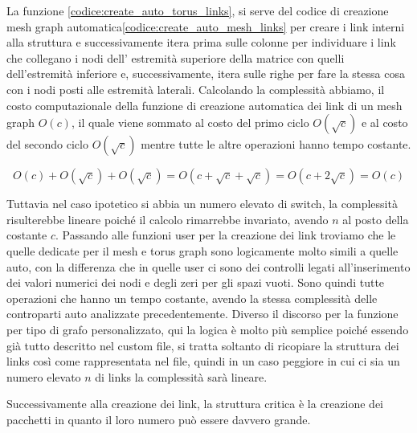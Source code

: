 \documentclass[binding=0.6cm]{sapthesis}
\begin{document}
La funzione \ref{codice:create_auto_torus_links}, si serve del codice di creazione mesh graph automatica\ref{codice:create_auto_mesh_links} per 
creare i link interni alla struttura e successivamente itera prima sulle colonne per individuare i link che collegano i nodi dell' estremità superiore della matrice con quelli dell'estremità inferiore e,
successivamente, itera sulle righe per fare la stessa cosa con i nodi posti alle estremità laterali.
Calcolando la complessità abbiamo, il costo computazionale della funzione di creazione automatica dei link di un mesh graph \(O(c)\), il quale
viene sommato al costo del primo ciclo \(O(\sqrt{c})\) e al costo del secondo ciclo \(O(\sqrt{c})\) mentre tutte le altre operazioni hanno tempo costante.

\[
    O(c) + O(\sqrt{c}) + O(\sqrt{c}) = O(c + \sqrt{c} + \sqrt{c}) = O(c + 2\sqrt{c}) = O(c)
\]

Tuttavia nel caso ipotetico si abbia un numero elevato di switch, la complessità risulterebbe lineare poiché il calcolo rimarrebbe invariato, avendo
\(n\) al posto della costante \(c\).
Passando alle funzioni user per la creazione dei link troviamo che le quelle dedicate per il mesh e torus graph sono logicamente molto simili a quelle auto, con
la differenza che in quelle user ci sono dei controlli legati all'inserimento dei valori numerici dei nodi e degli zeri per gli spazi vuoti. Sono quindi tutte operazioni che hanno un tempo costante,
avendo la stessa complessità delle controparti auto analizzate precedentemente.
Diverso il discorso per la funzione per tipo di grafo personalizzato, qui la logica è molto più semplice
poiché essendo già tutto descritto nel custom file, si tratta soltanto di ricopiare la struttura dei links così come rappresentata nel file,
quindi in un caso peggiore in cui ci sia un numero elevato \(n\) di links la complessità sarà lineare.

Successivamente alla creazione dei link, la struttura critica è la creazione dei pacchetti in quanto il loro numero può essere davvero grande.
\end{document}
